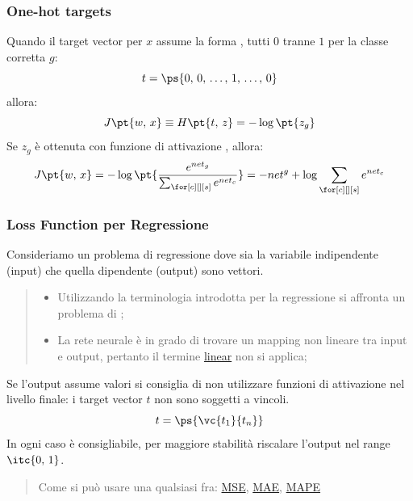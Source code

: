 \subsubsection{One-hot targets}\label{sec:one_hot_targets} %
Quando il target vector per $x$ assume la forma , tutti $0$ tranne $1$ per la classe corretta $g$:
\[
    t = \ps{0,\,0,\,\dots,\,1,\,\dots,\,0}
\]
allora:
\[
    J\pt{w,\,x} \equiv H\pt{t,\,z} = -\log{\pt{z_g}}
\]
Se $z_g$ è ottenuta con funzione di attivazione , allora:
\[
    J\pt{w,\,x} = -\log{\pt{\frac{e^{net_g}}{\sum_{\for[c][][s]}{e^{net_c}}}} = -net^g + \log{\sum_{\for[c][][s]}e^{net_c}}}
\]
%
\subsubsection{Loss Function per Regressione}\label{sec:loss_function_per_regressione} %
Consideriamo un problema di regressione dove sia la variabile indipendente (input) che quella dipendente (output) sono vettori.
\begin{quote}
    \begin{itemize}
        \item Utilizzando la terminologia introdotta per la regressione si affronta un problema di ;
        \item La rete neurale è in grado di trovare un mapping non lineare tra input e output, pertanto il termine \hyperref[sec:lineare]{linear} non si applica;
    \end{itemize}
\end{quote}
Se l'output assume valori  si consiglia di non utilizzare funzioni di attivazione nel livello finale: i target vector $t$ non sono soggetti a vincoli.
\[
    t = \ps{\vc{t_1}{t_n}}
\]
In ogni caso è consigliabile, per maggiore stabilità riscalare l'output nel range $\itc{0,\,1}$.
\begin{quote}
    Come  si può usare una qualsiasi fra: \hyperref[def:rmse]{MSE}, \hyperref[def:mae]{MAE}, \hyperref[def:mape]{MAPE}
\end{quote}
%
